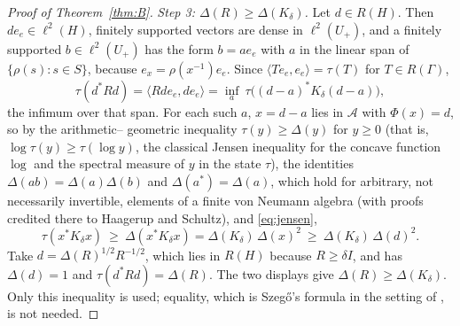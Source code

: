 \documentclass[11pt]{amsart}
\theoremstyle{remark}
\theoremstyle{definition}
\newcommand{\Ga}{\Gamma}
\newcommand{\FK}{\Delta}
\newcommand{\tr}{\tau}
\newcommand{\ltwo}{\ell^2}
\begin{document}
\begin{proof}[Proof of Theorem~\ref{thm:B}]
\emph{Step 3: $\FK(R)\ge\FK(K_\delta)$.} Let $d\in R(H)$. Then $de_e\in\ltwo(H)$, finitely supported vectors are dense in
$\ltwo(U_+)$, and a finitely supported $b\in\ltwo(U_+)$ has the form $b=ae_e$ with $a$ in the linear span of
$\{\rho(s):s\in S\}$, because $e_x=\rho(x^{-1})e_e$. Since $\langle Te_e,e_e\rangle=\tr(T)$ for $T\in R(\Ga)$,
\[
\tr(d^*Rd)=\langle Rde_e,de_e\rangle=\inf_a\ \tr\bigl((d-a)^*K_\delta(d-a)\bigr),
\]
the infimum over that span. For each such $a$, $x=d-a$ lies in $\mathcal A$ with $\Phi(x)=d$, so by the arithmetic--
geometric inequality $\tr(y)\ge\FK(y)$ for $y\ge0$ (that is, $\log\tr(y)\ge\tr(\log y)$, the classical Jensen inequality
for the concave function $\log$ and the spectral measure of $y$ in the state $\tr$), the identities $\FK(ab)=\FK(a)\FK(b)$ and $\FK(a^*)=\FK(a)$, which
hold for arbitrary, not necessarily invertible, elements of a finite von Neumann algebra \cite[Thm.~2.1]{BL} (with
proofs credited there to Haagerup and Schultz), and \eqref{eq:jensen},
\[
\tr(x^*K_\delta x)\ \ge\ \FK(x^*K_\delta x)=\FK(K_\delta)\,\FK(x)^2\ \ge\ \FK(K_\delta)\,\FK(d)^2 .
\]
Take $d=\FK(R)^{1/2}R^{-1/2}$, which lies in $R(H)$ because $R\ge\delta I$, and has $\FK(d)=1$ and
$\tr(d^*Rd)=\FK(R)$. The two displays give $\FK(R)\ge\FK(K_\delta)$. Only this inequality is used; equality, which is
Szeg\H{o}'s formula in the setting of \cite{Lab05}, is not needed.


\end{proof}
\end{document}
